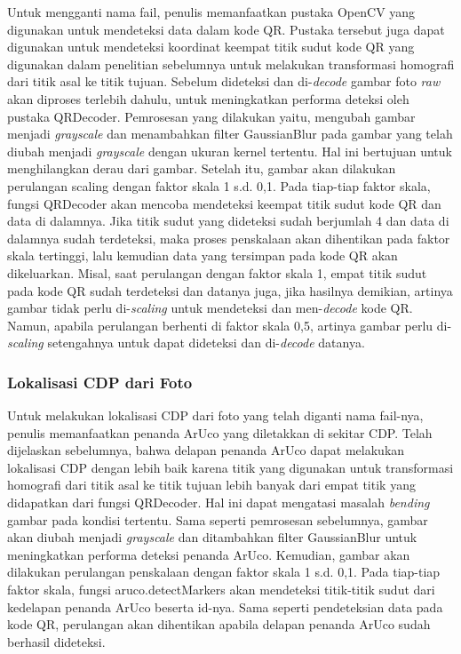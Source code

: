 Untuk mengganti nama fail, penulis memanfaatkan pustaka OpenCV yang digunakan untuk mendeteksi data dalam kode QR. Pustaka tersebut juga dapat digunakan untuk
mendeteksi koordinat keempat titik sudut kode QR yang digunakan dalam penelitian sebelumnya untuk melakukan transformasi homografi dari titik asal ke titik
tujuan. Sebelum dideteksi dan di-\emph{decode} gambar foto \emph{raw} akan diproses terlebih dahulu, untuk meningkatkan performa deteksi oleh pustaka
QRDecoder. Pemrosesan yang dilakukan yaitu, mengubah gambar menjadi \emph{grayscale} dan menambahkan filter GaussianBlur pada gambar yang telah diubah menjadi
\emph{grayscale} dengan ukuran kernel tertentu. Hal ini bertujuan untuk menghilangkan derau dari gambar. Setelah itu, gambar akan dilakukan perulangan scaling
dengan faktor skala 1 s.d. 0,1. Pada tiap-tiap faktor skala, fungsi QRDecoder akan mencoba mendeteksi keempat titik sudut kode QR dan data di dalamnya. Jika
titik sudut yang dideteksi sudah berjumlah 4 dan data di dalamnya sudah terdeteksi, maka proses penskalaan akan dihentikan pada faktor skala tertinggi, lalu
kemudian data yang tersimpan pada kode QR akan dikeluarkan. Misal, saat perulangan dengan faktor skala 1, empat titik sudut pada kode QR sudah terdeteksi dan
datanya juga, jika hasilnya demikian, artinya gambar tidak perlu di-\emph{scaling} untuk mendeteksi dan men-\emph{decode} kode QR. Namun, apabila perulangan
berhenti di faktor skala 0,5, artinya gambar perlu di-\emph{scaling} setengahnya untuk dapat dideteksi dan di-\emph{decode} datanya.

\subsubsection{Lokalisasi CDP dari Foto}
Untuk melakukan lokalisasi CDP dari foto yang telah diganti nama fail-nya, penulis memanfaatkan penanda ArUco yang diletakkan di sekitar CDP. Telah dijelaskan
sebelumnya, bahwa delapan penanda ArUco dapat melakukan lokalisasi CDP dengan lebih baik karena titik yang digunakan untuk transformasi homografi dari titik
asal ke titik tujuan lebih banyak dari empat titik yang didapatkan dari fungsi QRDecoder. Hal ini dapat mengatasi masalah \emph{bending} gambar pada kondisi
tertentu. Sama seperti pemrosesan sebelumnya, gambar akan diubah menjadi \emph{grayscale} dan ditambahkan filter GaussianBlur untuk meningkatkan performa
deteksi penanda ArUco. Kemudian, gambar akan dilakukan perulangan penskalaan dengan faktor skala 1 s.d. 0,1. Pada tiap-tiap faktor skala, fungsi
aruco.detectMarkers akan mendeteksi titik-titik sudut dari kedelapan penanda ArUco beserta id-nya. Sama seperti pendeteksian data pada kode QR, perulangan akan
dihentikan apabila delapan penanda ArUco sudah berhasil dideteksi.

